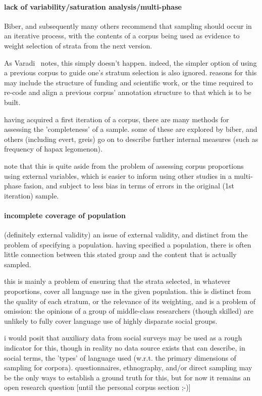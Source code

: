 \paragraph{ lack of variability/saturation analysis/multi-phase}
Biber, and subsequently many others  recommend that sampling should occur in an iterative process, with the contents of a corpus being used as evidence to weight selection of strata from the next version.

As Varadi~\cite{varadi2000corpus}\cite{varadi2001linguistic} notes, this simply doesn't happen.  indeed, the simpler option of using a previous corpus to guide one's stratum selection is also ignored.  reasons for this may include the structure of funding and scientific work, or the time required to re-code and align a previous corpus' annotation structure to that which is to be built.  

having acquired a first iteration of a corpus, there are many methods for assessing the 'completeness' of a sample.  some of these are explored by biber, and others (including evert, greis) go on to describe further internal measures (such as frequency of hapax legomenon).

note that this is quite aside from the problem of assessing corpus proportions using external variables, which is easier to inform using other studies in a multi-phase fasion, and subject to less bias in terms of errors in the original (1st iteration) sample.


\paragraph{ incomplete coverage of population }
(definitely external validity)
an issue of external validity, and distinct from the problem of specifying a population.  having specified a population, there is often little connection between this stated group and the content that is actually sampled.

this is mainly a problem of ensuring that the strata selected, in whatever proportions, cover all language use in the given population.  this is distinct from the quality of each stratum, or the relevance of its weighting, and is a problem of omission: the opinions of a group of middle-class researchers (though skilled) are unlikely to fully cover language use of highly disparate social groups.

i would posit that auxiliary data from social surveys may be used as a rough indicator for this, though in reality no data source exists that can describe, in social terms, the 'types' of language used (w.r.t. the primary dimensions of sampling for corpora).  questionnaires, ethnography, and/or direct sampling may be the only ways to establish a ground truth for this, but for now it remains an open research question [until the personal corpus section ;-)]





